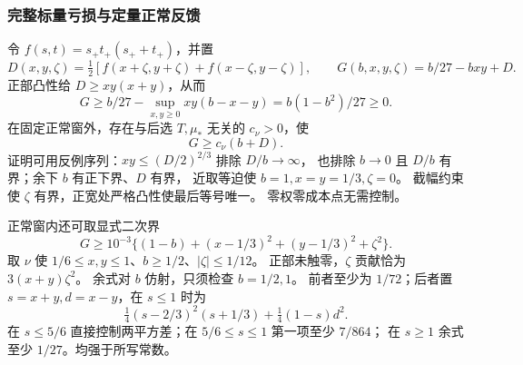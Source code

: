 \subsubsection{完整标量亏损与定量正常反馈}

令 \(f(s,t)=s_+t_+(s_++t_+)\)，并置
\[
 D(x,y,\zeta)=\tfrac12[f(x+\zeta,y+\zeta)+f(x-\zeta,y-\zeta)],
 \qquad G(b,x,y,\zeta)=b/27-bxy+D.
\]
正部凸性给 \(D\ge xy(x+y)\)，从而
\[
 G\ge b/27-\sup_{x,y\ge0}xy(b-x-y)=b(1-b^2)/27\ge0.
\]
在固定正常窗外，存在与后选 \(T,\mu_*\) 无关的 \(c_\nu>0\)，使
\begin{equation}\label{eighth:global-coercivity}
 G\ge c_\nu(b+D).
\end{equation}
证明可用反例序列：\(xy\le(D/2)^{2/3}\) 排除 \(D/b\to\infty\)，
也排除 \(b\to0\) 且 \(D/b\) 有界；余下 \(b\) 有正下界、\(D\) 有界，
近取等迫使 \(b=1,x=y=1/3,\zeta=0\)。
截幅约束使 \(\zeta\) 有界，正宽处严格凸性使最后等号唯一。
零权零成本点无需控制。

正常窗内还可取显式二次界
\begin{equation}\label{eighth:quadratic}
 G\ge10^{-3}\{(1-b)+(x-1/3)^2+(y-1/3)^2+\zeta^2\}.
\end{equation}
取 \(\nu\) 使 \(1/6\le x,y\le1\)、\(b\ge1/2\)、\(|\zeta|\le1/12\)。
正部未触零，\(\zeta\) 贡献恰为 \(3(x+y)\zeta^2\)。
余式对 \(b\) 仿射，只须检查 \(b=1/2,1\)。
前者至少为 \(1/72\)；后者置 \(s=x+y,d=x-y\)，在 \(s\le1\) 时为
\[
 \tfrac14(s-2/3)^2(s+1/3)+\tfrac14(1-s)d^2.
\]
在 \(s\le5/6\) 直接控制两平方差；在 \(5/6\le s\le1\) 第一项至少 \(7/864\)；
在 \(s\ge1\) 余式至少 \(1/27\)。均强于所写常数。

